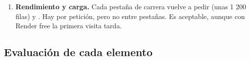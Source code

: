 \begin{enumerate}
\begin{itemize}
\item {} es deliberado (la tabla sustituye al gráfico), pero el tooltip no es accesible con el teclado. No hay forma de «recorrer» la serie.
\item El texto del violín es de 10 px dentro de un  que se escala hacia abajo: en la práctica queda por debajo de 8 px (captura).
\item El resumen de G16 dice «Lewis Hamilton suma más títulos: 7» cuando empata con Schumacher. Los resúmenes deberían detectar empates.
\end{itemize}
\item \textbf{Rendimiento y carga.} Cada pestaña de carrera vuelve a pedir  (unas 1 200 filas) y . Hay  por petición, pero no entre pestañas. Es aceptable, aunque con Render free la primera visita tarda.
\end{enumerate}

\subsection{Evaluación de cada elemento}

